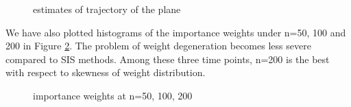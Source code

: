 \documentclass{article}
\begin{document}
\begin{figure}[h]
        \caption{\label{5} estimates of trajectory of the plane}
    \end{figure}

We have also plotted histograms of the importance weights under n=50, 100 and 200 in Figure \ref{6}. The problem of weight degeneration becomes less severe compared to SIS methods. Among these three time points, n=200 is the best with respect to skewness of weight distribution.

\begin{figure}[h]
        \caption{\label{6} importance weights at n=50, 100, 200}
    \end{figure}
    
\end{document}
